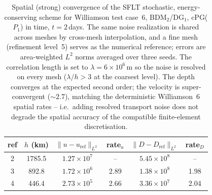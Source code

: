 
\begin{table}[htbp]
  \centering
  \begin{tabular}{c c c c c c}
    \toprule
    ref & $h$ (km) & $\|u-u_{\mathrm{ref}}\|_{L^2}$ & rate$_u$
        & $\|D-D_{\mathrm{ref}}\|_{L^2}$ & rate$_D$ \\
    \midrule
    2 & 1785.5 & $1.27\times10^{7}$ & --   & $5.45\times10^{8}$ & --   \\
    3 &  892.8 & $1.72\times10^{6}$ & 2.89 & $1.38\times10^{8}$ & 1.98 \\
    4 &  446.4 & $2.73\times10^{5}$ & 2.66 & $3.36\times10^{7}$ & 2.04 \\
    \bottomrule
  \end{tabular}
  \caption{Spatial (strong) convergence of the SFLT stochastic, energy-conserving
    scheme for Williamson test case~6, BDM$_2$/DG$_1$, cPG($P_1$) in time,
    $t = 2$\,days. The same noise realization is shared across meshes by
    cross-mesh interpolation, and a fine mesh (refinement level~5) serves as the
    numerical reference; errors are area-weighted $L^2$ norms averaged over three
    seeds. The correlation length is set to $\lambda = 6\times10^{6}$\,m so the
    noise is resolved on every mesh ($\lambda/h > 3$ at the coarsest level). The
    depth converges at the expected second order; the velocity is
    super-convergent ($\sim\!2.7$), matching the deterministic Williamson~6
    spatial rates -- i.e.\ adding resolved transport noise does not degrade the
    spatial accuracy of the compatible finite-element discretisation.}
  \label{tab:w6-sflt-spatial}
\end{table}

